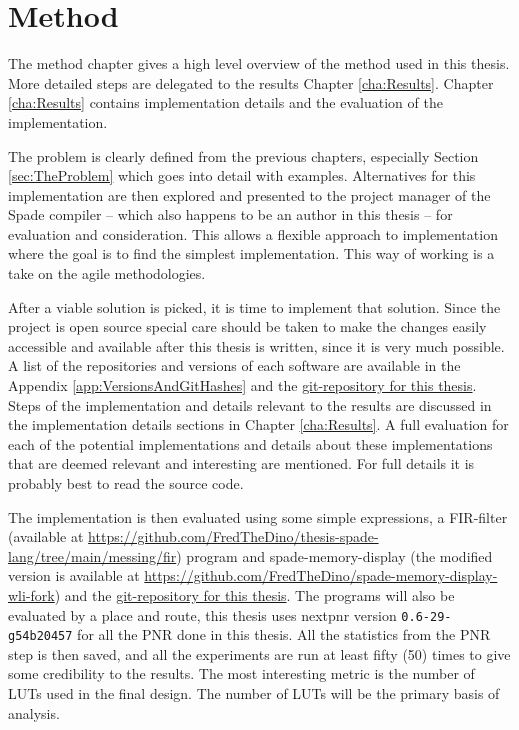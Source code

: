 \chapter{Method}
The method chapter gives a high level overview of the method used in this thesis. More detailed steps are delegated to the results Chapter \ref{cha:Results}. Chapter \ref{cha:Results} contains implementation details and the evaluation of the implementation.

The problem is clearly defined from the previous chapters, especially Section \ref{sec:TheProblem} which goes into detail with examples. Alternatives for this implementation are then explored and presented to the project manager of the Spade compiler -- which also happens to be an author in this thesis -- for evaluation and consideration. This allows a flexible approach to implementation where the goal is to find the simplest implementation. This way of working is a take on the agile methodologies.

After a viable solution is picked, it is time to implement that solution. Since the project is open source special care should be taken to make the changes easily accessible and available after this thesis is written, since it is very much possible. A list of the repositories and versions of each software are available in the Appendix \ref{app:VersionsAndGitHashes} and the \href{https://github.com/FredTheDino/thesis-spade-lang}{git-repository for this thesis}. Steps of the implementation and details relevant to the results are discussed in the implementation details sections in Chapter \ref{cha:Results}. A full evaluation for each of the potential implementations and details about these implementations that are deemed relevant and interesting are mentioned. For full details it is probably best to read the source code. 

The implementation is then evaluated using some simple expressions, a FIR-filter (available at \href{https://github.com/FredTheDino/thesis-spade-lang/tree/main/messing/fir}{https://github.com/FredTheDino/thesis-spade-lang/tree/main/messing/fir}) program and spade-memory-display (the modified version is available at \href{https://github.com/FredTheDino/spade-memory-display-wli-fork}{https://github.com/FredTheDino/spade-memory-display-wli-fork}) and the \href{https://github.com/FredTheDino/thesis-spade-lang}{git-repository for this thesis}. The programs will also be evaluated by a place and route, this thesis uses nextpnr version \verb+0.6-29-g54b20457+ for all the PNR done in this thesis. All the statistics from the PNR step is then saved, and all the experiments are run at least fifty (50) times to give some credibility to the results. The most interesting metric is the number of LUTs used in the final design. The number of LUTs will be the primary basis of analysis.

